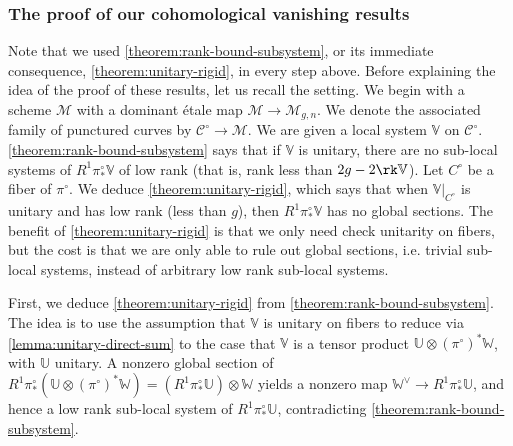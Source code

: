 \subsubsection{The proof of our cohomological vanishing results}
\label{subsubsection:rigidity-idea}
Note that we used \autoref{theorem:rank-bound-subsystem}, or its immediate consequence,
\autoref{theorem:unitary-rigid},
in every step above.
Before explaining the idea of the proof of these results, let us recall the
setting. We begin with a scheme $\mathscr M$ with a dominant \'etale map
$\mathscr M \to \mathscr M_{g,n}$.  We denote the associated family of punctured curves by $\mathscr
C^\circ \to \mathscr M$. We are given a local system $\mathbb V$ on $\mathscr C^\circ$.
\autoref{theorem:rank-bound-subsystem} says that if $\mathbb{V}$ is unitary,
there are no sub-local systems of $R^1 \pi^\circ_* \mathbb V$ of low rank (that is, rank less
than $2g - 2\rk \mathbb V$).
Let $C^\circ$ be a fiber of $\pi^\circ$.
We deduce \autoref{theorem:unitary-rigid}, which says that when $\mathbb
V|_{C^\circ}$
is unitary and has low rank (less than $g$), then $R^1 \pi^\circ_* \mathbb V$ has no global sections.
The benefit of \autoref{theorem:unitary-rigid} is that we only need check
unitarity on fibers, but the cost is that we are only able to rule out global
sections, i.e. trivial sub-local systems, instead of arbitrary low rank
sub-local systems.

First, we deduce \autoref{theorem:unitary-rigid} from
\autoref{theorem:rank-bound-subsystem}.
The idea is to use the assumption that
$\mathbb V$ is unitary on fibers to
reduce via \autoref{lemma:unitary-direct-sum} to the case that $\mathbb V$ is a
tensor product $\mathbb U \otimes (\pi^\circ)^* \mathbb W$, with $\mathbb{U}$ unitary.
A nonzero global section of $R^1\pi^\circ_*(\mathbb U \otimes (\pi^\circ)^* \mathbb W)=(R^1\pi^\circ_*\mathbb{U})\otimes \mathbb{W}$ yields a nonzero map $\mathbb W^\vee \to R^1 \pi^\circ_* \mathbb U$, and hence a
low rank sub-local system of $R^1 \pi^\circ_* \mathbb U$, contradicting
\autoref{theorem:rank-bound-subsystem}.

